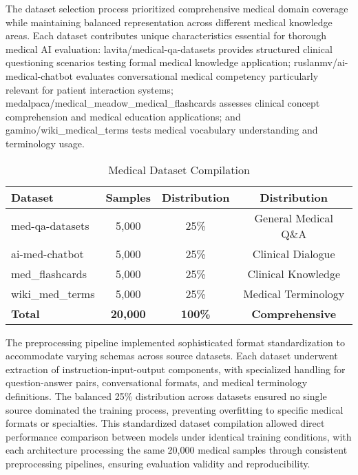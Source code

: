 \documentclass[conference]{IEEEtran}
\begin{document}
The dataset selection process prioritized comprehensive medical domain coverage while maintaining balanced representation across different medical knowledge areas. Each dataset contributes unique characteristics essential for thorough medical AI evaluation: lavita/medical-qa-datasets provides structured clinical questioning scenarios testing formal medical knowledge application; ruslanmv/ai-medical-chatbot evaluates conversational medical competency particularly relevant for patient interaction systems; medalpaca/medical\_meadow\_medical\_flashcards assesses clinical concept comprehension and medical education applications; and gamino/wiki\_medical\_terms tests medical vocabulary understanding and terminology usage.


\begin{table}[htbp]
\caption{Medical Dataset Compilation}
\begin{center}
\footnotesize
\begin{tabular}{|p{2cm}|c|c|c|}
\hline
\textbf{Dataset} & \textbf{Samples} & \textbf{Distribution} & \textbf{Distribution} \\
\hline
med-qa-datasets & 5,000 & 25\% & General Medical Q\&A \\
\hline
ai-med-chatbot & 5,000 & 25\% & Clinical Dialogue \\
\hline
med\_flashcards & 5,000 & 25\% & Clinical Knowledge \\
\hline
wiki\_med\_terms & 5,000 & 25\% & Medical Terminology \\
\hline
\textbf{Total} & \textbf{20,000} & \textbf{100\%} & \textbf{Comprehensive} \\
\hline
\end{tabular}
\label{tab:evaluation_datasets}
\end{center}
\end{table}

The preprocessing pipeline implemented sophisticated format standardization to accommodate varying schemas across source datasets. Each dataset underwent extraction of instruction-input-output components, with specialized handling for question-answer pairs, conversational formats, and medical terminology definitions. The balanced 25\% distribution across datasets ensured no single source dominated the training process, preventing overfitting to specific medical formats or specialties. This standardized dataset compilation allowed direct performance comparison between models under identical training conditions, with each architecture processing the same 20,000 medical samples through consistent preprocessing pipelines, ensuring evaluation validity and reproducibility.
\end{document}
